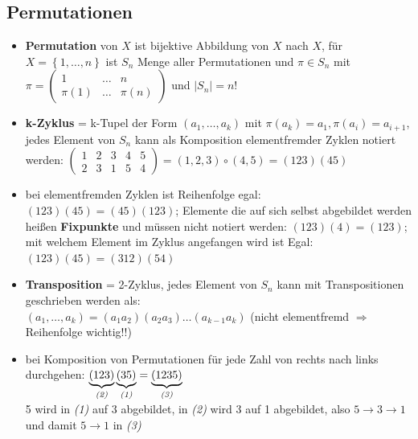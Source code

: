 \documentclass[10pt,a4paper]{article}
\begin{document}
\subsection{Permutationen}
\begin{itemize}
\item \textbf{Permutation} von $X$ ist bijektive Abbildung von $X$ nach $X$, für $X=\left\lbrace 1,\dotsc, n\right\rbrace$ ist $S_{n}$ Menge aller Permutationen und $\pi \in S_{n}$ mit $\pi=\begin{pmatrix}1&\dotsc& n\\ \pi(1)&\dotsc &\pi(n)\end{pmatrix} $ und $\vert S_{n}\vert =n!$
\item \textbf{k-Zyklus} = k-Tupel der Form $(a_{1},\dotsc,a_{k})$ mit $\pi(a_{k})=a_{1}, \pi(a_{i})=a_{i+1}$, jedes Element von $S_{n}$ kann als Komposition elementfremder Zyklen notiert werden: $\begin{pmatrix}1&2& 3&4&5\\ 2&3&1&5&4\end{pmatrix}=(1,2,3)\circ (4,5)=(123)(45)$
\item bei elementfremden Zyklen ist Reihenfolge egal: $(123)(45)=(45)(123)$; Elemente die auf sich selbst abgebildet werden heißen \textbf{Fixpunkte} und müssen nicht notiert werden: $(123)(4)=(123)$; mit welchem Element im Zyklus angefangen wird ist Egal: $(123)(45)=(312)(54)$ 
\item \textbf{Transposition} = 2-Zyklus, jedes Element von $S_{n}$ kann mit Transpositionen geschrieben werden als:\\ $(a_{1},\dotsc, a_{k})=(a_{1}a_{2})(a_{2}a_{3})\dotsc(a_{k-1}a_{k})$ (nicht elementfremd $\Rightarrow$ Reihenfolge wichtig!!)
\item bei Komposition von Permutationen für jede Zahl von rechts nach links durchgehen: $\underbrace{(123)}_{\text{\textit{(2)}}}\underbrace{(35)}_{\text{\textit{(1)}}}=\underbrace{(1235)}_{\text{\textit{(3)}}}$\\5 wird in \textit{(1)} auf 3 abgebildet, in \textit{(2)} wird 3 auf 1 abgebildet, also $5\rightarrow 3 \rightarrow 1$ und damit $5\rightarrow 1$  in \textit{(3)} 
\end{itemize}
\end{document}
